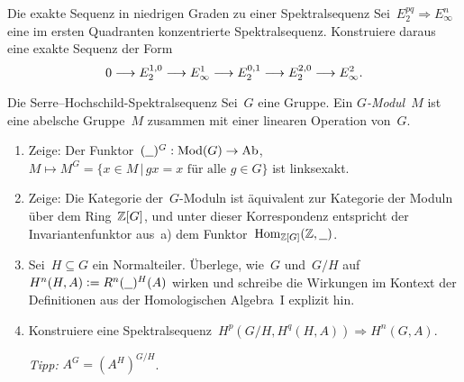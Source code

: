 \documentclass{uebblatt}
\begin{document}
\begin{aufgabe}{Die exakte Sequenz in niedrigen Graden zu einer
Spektralsequenz}
Sei~$E_2^{pq} \Rightarrow E_\infty^n$ eine im ersten Quadranten konzentrierte
Spektralsequenz. Konstruiere daraus eine exakte Sequenz der Form
\[ 0 \longrightarrow E_2^{1,0} \longrightarrow E^1_\infty \longrightarrow E_2^{0,1} \longrightarrow E_2^{2,0} \longrightarrow
E^2_\infty. \]
\end{aufgabe}
\vspace{-1.5em}

\begin{aufgabe}{Die Serre--Hochschild-Spektralsequenz}
Sei~$G$ eine Gruppe. Ein \emph{$G$-Modul}~$M$ ist eine abelsche Gruppe~$M$
zusammen mit einer linearen Operation von~$G$.
\begin{enumerate}
\item Zeige: Der Funktor~$(\underline{\ \ })^G : \mathrm{Mod}(G) \to \mathrm{Ab}$, $M \mapsto M^G = \{ x \in M \,|\,
\text{$gx = x$ für alle $g \in G$} \}$ ist linksexakt.
\item Zeige: Die Kategorie der~$G$-Moduln ist äquivalent zur Kategorie der
Moduln über dem Ring~$\mathbb{Z}[G]$, und unter dieser Korrespondenz entspricht der
Invariantenfunktor aus~a) dem Funktor~$\mathrm{Hom}_{\mathbb{Z}[G]}(\mathbb{Z}, \underline{\ \ })$.
\item Sei~$H \subseteq G$ ein Normalteiler. Überlege, wie~$G$ und~$G/H$ auf~$H^n(H,A)
\vcentcolon= R^n(\underline{\ \ })^H(A)$ wirken und schreibe die Wirkungen im Kontext
der Definitionen aus der Homologischen Algebra~I explizit hin.
\item Konstruiere eine Spektralsequenz~$H^p(G/H, H^q(H,A))
\Rightarrow H^n(G,A)$.
{\tiny\emph{Tipp:} $A^G = (A^H)^{G/H}$.\par}
\end{enumerate}
\end{aufgabe}
\end{document}
